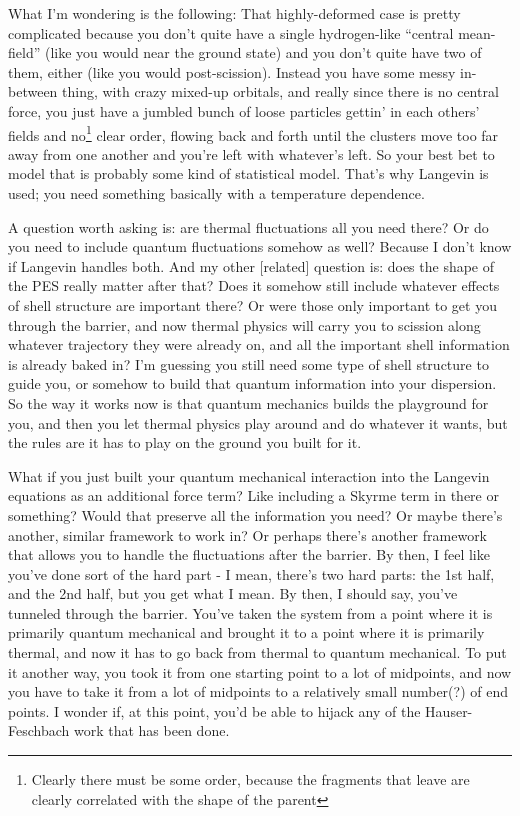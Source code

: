 What I'm wondering is the following: That highly-deformed case is pretty complicated because you don't quite have a single hydrogen-like ``central mean-field'' (like you would near the ground state) and you don't quite have two of them, either (like you would post-scission). Instead you have some messy in-between thing, with crazy mixed-up orbitals, and really since there is no central force, you just have a jumbled bunch of loose particles gettin' in each others' fields and no\footnote{Clearly there must be some order, because the fragments that leave are clearly correlated with the shape of the parent} clear order, flowing back and forth until the clusters move too far away from one another and you're left with whatever's left. So your best bet to model that is probably some kind of statistical model. That's why Langevin is used; you need something basically with a temperature dependence.

A question worth asking is: are thermal fluctuations all you need there? Or do you need to include quantum fluctuations somehow as well? Because I don't know if Langevin handles both. And my other [related] question is: does the shape of the PES really matter after that? Does it somehow still include whatever effects of shell structure are important there? Or were those only important to get you through the barrier, and now thermal physics will carry you to scission along whatever trajectory they were already on, and all the important shell information is already baked in? I'm guessing you still need some type of shell structure to guide you, or somehow to build that quantum information into your dispersion. So the way it works now is that quantum mechanics builds the playground for you, and then you let thermal physics play around and do whatever it wants, but the rules are it has to play on the ground you built for it.

What if you just built your quantum mechanical interaction into the Langevin equations as an additional force term? Like including a Skyrme term in there or something? Would that preserve all the information you need? Or maybe there's another, similar framework to work in? Or perhaps there's another framework that allows you to handle the fluctuations after the barrier. By then, I feel like you've done sort of the hard part - I mean, there's two hard parts: the 1st half, and the 2nd half, but you get what I mean. By then, I should say, you've tunneled through the barrier. You've taken the system from a point where it is primarily quantum mechanical and brought it to a point where it is primarily thermal, and now it has to go back from thermal to quantum mechanical. To put it another way, you took it from one starting point to a lot of midpoints, and now you have to take it from a lot of midpoints to a relatively small number(?) of end points. I wonder if, at this point, you'd be able to hijack any of the Hauser-Feschbach work that has been done.


